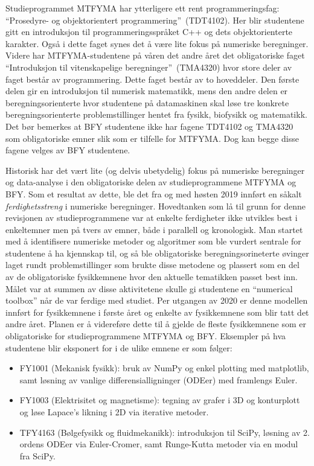 \documentclass{article}
\begin{document}
Studieprogrammet MTFYMA har ytterligere ett rent programmeringsfag: ``Prosedyre- og objektorientert programmering''~(TDT4102). Her blir studentene gitt en introduksjon til programmeringsspråket C++ og dets objektorienterte karakter. Også i dette faget synes det å være lite fokus på numeriske beregninger. Videre har MTFYMA-studentene på våren det andre året det obligatoriske faget ``Introduksjon til vitenskapelige beregninger''~(TMA4320) hvor store deler av faget består av programmering. Dette faget består av to hoveddeler. Den første delen gir en introduksjon til numerisk matematikk, mens den andre delen er beregningsorienterte hvor studentene på datamaskinen skal løse tre konkrete beregningsorienterte problemstillinger hentet fra fysikk, biofysikk og matematikk. Det bør bemerkes at BFY studentene ikke har fagene TDT4102 og TMA4320 som obligatoriske emner slik som er tilfelle for MTFYMA. Dog kan begge disse fagene velges av BFY studentene.

Historisk har det vært lite (og delvis ubetydelig) fokus på numeriske beregninger og data-analyse i den obligatoriske delen av studieprogrammene MTFYMA og BFY. Som et resultat av dette, ble det fra og med høsten 2019 innført en såkalt \emph{ferdighetsstreng} i numeriske beregninger. Hovedtanken som lå til grunn for denne revisjonen av studieprogrammene var at enkelte ferdigheter ikke utvikles best i enkeltemner men på tvers av emner, både i parallell og kronologisk. Man startet med å identifisere numeriske metoder og algoritmer som ble vurdert sentrale for studentene å ha kjennskap til, og så ble obligatoriske beregningsorineterte øvinger laget rundt problemstillinger som brukte disse metodene og plassert som en del av de obligatoriske fysikkemnene hvor den aktuelle tematikken passet best inn. Målet var at summen av disse aktivitetene skulle gi studentene en ``numerical toolbox'' når de var ferdige med studiet. Per utgangen av 2020 er denne modellen innført for fysikkemnene i første året og enkelte av fysikkemnene som blir tatt det andre året. Planen er å videreføre dette til å gjelde de fleste fysikkemnene som er obligatoriske for studieprogrammene MTFYMA og BFY. Eksempler på hva studentene blir eksponert for i de ulike emnene er som følger:
\begin{itemize}
  \item FY1001 (Mekanisk fysikk): bruk av NumPy og enkel plotting med matplotlib, samt løsning av vanlige differensialligninger (ODEer) med framlengs Euler.
  \item FY1003 (Elektrisitet og magnetisme): tegning av grafer i 3D og konturplott og løse Lapace's likning i 2D via iterative metoder.
  \item TFY4163 (Bølgefysikk og fluidmekanikk): introduksjon til SciPy, løsning av 2. ordens ODEer via Euler-Cromer, samt Runge-Kutta metoder via en modul fra SciPy.
\end{itemize}
\end{document}
